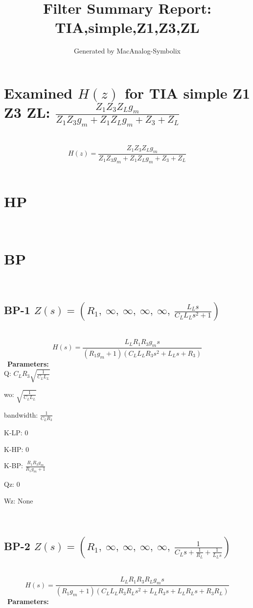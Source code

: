 \documentclass{article}
\begin{document}
        
                        \title{Filter Summary Report: TIA,simple,Z1,Z3,ZL}
                        \author{Generated by MacAnalog-Symbolix}
                        \maketitle

                        \tableofcontents
                        \newpage
                        \section{Examined $H(z)$ for TIA simple Z1 Z3 ZL: $\frac{Z_{1} Z_{3} Z_{L} g_{m}}{Z_{1} Z_{3} g_{m} + Z_{1} Z_{L} g_{m} + Z_{3} + Z_{L}}$ }\ 
\textbf{\[H(z) = \frac{Z_{1} Z_{3} Z_{L} g_{m}}{Z_{1} Z_{3} g_{m} + Z_{1} Z_{L} g_{m} + Z_{3} + Z_{L}}\] }\ 
\section{HP}\ 
\section{BP}\ 
\subsection{BP-1 $Z(s) = \left( R_{1}, \  \infty, \  \infty, \  \infty, \  \infty, \  \frac{L_{L} s}{C_{L} L_{L} s^{2} + 1}\right)$ } \ 
\textbf{\[H(s) = \frac{L_{L} R_{1} R_{3} g_{m} s}{\left(R_{1} g_{m} + 1\right) \left(C_{L} L_{L} R_{3} s^{2} + L_{L} s + R_{3}\right)}\] } \ 
\textbf{Parameters:}\\ 

Q: $C_{L} R_{3} \sqrt{\frac{1}{C_{L} L_{L}}}$\ 

wo: $\sqrt{\frac{1}{C_{L} L_{L}}}$\ 

bandwidth: $\frac{1}{C_{L} R_{3}}$\ 

K-LP: $0$\ 

K-HP: $0$\ 

K-BP: $\frac{R_{1} R_{3} g_{m}}{R_{1} g_{m} + 1}$\ 

Qz: $0$\ 

Wz: $\text{None}$\ 

\ 

\subsection{BP-2 $Z(s) = \left( R_{1}, \  \infty, \  \infty, \  \infty, \  \infty, \  \frac{1}{C_{L} s + \frac{1}{R_{L}} + \frac{1}{L_{L} s}}\right)$ } \ 
\textbf{\[H(s) = \frac{L_{L} R_{1} R_{3} R_{L} g_{m} s}{\left(R_{1} g_{m} + 1\right) \left(C_{L} L_{L} R_{3} R_{L} s^{2} + L_{L} R_{3} s + L_{L} R_{L} s + R_{3} R_{L}\right)}\] } \ 
\textbf{Parameters:}\\ 
\end{document}
